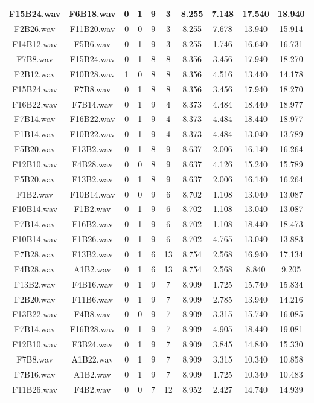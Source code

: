 \documentclass[11pt,a4paper,twoside]{book}
\begin{document}
\begin{longtable}[c]{|c|c|c|c|c|c|c|c|c|c|}
F15B24.wav&F6B18.wav&0&1&9&3&8.255&7.148&17.540&18.940\\ \hline
F2B26.wav&F11B20.wav&0&0&9&3&8.255&7.678&13.940&15.914\\ \hline
F14B12.wav&F5B6.wav&0&1&9&3&8.255&1.746&16.640&16.731\\ \hline
F7B8.wav&F15B24.wav&0&1&8&8&8.356&3.456&17.940&18.270\\ \hline
F2B12.wav&F10B28.wav&1&0&8&8&8.356&4.516&13.440&14.178\\ \hline
F15B24.wav&F7B8.wav&0&1&8&8&8.356&3.456&17.940&18.270\\ \hline
F16B22.wav&F7B14.wav&0&1&9&4&8.373&4.484&18.440&18.977\\ \hline
F7B14.wav&F16B22.wav&0&1&9&4&8.373&4.484&18.440&18.977\\ \hline
F1B14.wav&F10B22.wav&0&1&9&4&8.373&4.484&13.040&13.789\\ \hline
F5B20.wav&F13B2.wav&0&1&8&9&8.637&2.006&16.140&16.264\\ \hline
F12B10.wav&F4B28.wav&0&0&8&9&8.637&4.126&15.240&15.789\\ \hline
F5B20.wav&F13B2.wav&0&1&8&9&8.637&2.006&16.140&16.264\\ \hline
F1B2.wav&F10B14.wav&0&0&9&6&8.702&1.108&13.040&13.087\\ \hline
F10B14.wav&F1B2.wav&0&1&9&6&8.702&1.108&13.040&13.087\\ \hline
F7B14.wav&F16B2.wav&0&1&9&6&8.702&1.108&18.440&18.473\\ \hline
F10B14.wav&F1B26.wav&0&1&9&6&8.702&4.765&13.040&13.883\\ \hline
F7B28.wav&F13B2.wav&0&1&6&13&8.754&2.568&16.940&17.134\\ \hline
F4B28.wav&A1B2.wav&0&1&6&13&8.754&2.568&8.840&9.205\\ \hline
F13B2.wav&F4B16.wav&0&1&9&7&8.909&1.725&15.740&15.834\\ \hline
F2B20.wav&F11B6.wav&0&1&9&7&8.909&2.785&13.940&14.216\\ \hline
F13B22.wav&F4B8.wav&0&0&9&7&8.909&3.315&15.740&16.085\\ \hline
F7B14.wav&F16B28.wav&0&1&9&7&8.909&4.905&18.440&19.081\\ \hline
F12B10.wav&F3B24.wav&0&1&9&7&8.909&3.845&14.840&15.330\\ \hline
F7B8.wav&A1B22.wav&0&1&9&7&8.909&3.315&10.340&10.858\\ \hline
F7B16.wav&A1B2.wav&0&1&9&7&8.909&1.725&10.340&10.483\\ \hline
F11B26.wav&F4B2.wav&0&0&7&12&8.952&2.427&14.740&14.939\\ \hline

\end{longtable}
\end{document}

